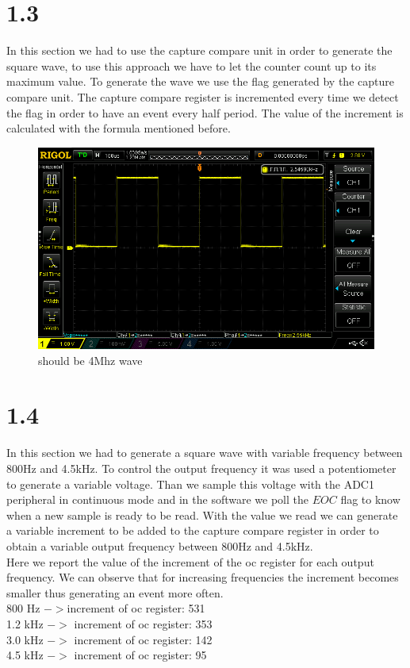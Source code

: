 \documentclass[12pt]{article}
\begin{document}
\section*{1.3}
In this section we had to use the capture compare unit in order to generate the square wave, to use this approach we have to let the counter count up to its maximum value. To generate the wave we use the flag generated by the capture compare unit. The capture compare register is incremented every time we detect the flag in order to have an event every half period. The value of the increment is calculated with the formula mentioned before.
\begin{figure}[h!]
	
	\includegraphics[scale = 0.4]{immagini/DS1Z_QuickPrint6}
	\caption{should be 4Mhz wave }
\end{figure}


\section*{1.4 }
In this section we had to generate a square wave with variable frequency between 800Hz and 4.5kHz. To control the output frequency it was used a potentiometer to generate a variable voltage. Than we sample this voltage with the ADC1 peripheral in continuous mode and in the software we poll the $EOC$ flag to know when a new sample is ready to be read. With the value we read we can generate a variable increment to be added to the capture compare register in order to obtain a variable output frequency between 800Hz and 4.5kHz.\\

Here we report the value of the increment of the oc register for each output frequency. We can observe that for increasing frequencies the increment becomes smaller thus generating an event more often.\\

800 Hz \space $->$increment of oc register: 531\\
1.2 kHz $->$ increment of oc register: 353\\
3.0 kHz $->$ increment of oc register: 142\\
4.5 kHz $->$ increment of oc register: 95\\
\end{document}
